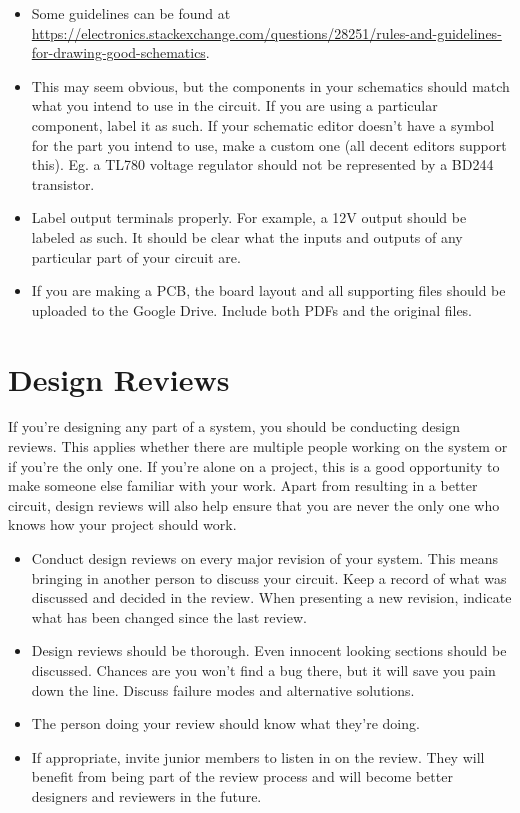 \documentclass{article}
\begin{document}
\begin{enumerate}
\begin{itemize}
\item Some guidelines can be found at \url{https://electronics.stackexchange.com/questions/28251/rules-and-guidelines-for-drawing-good-schematics}.
\item This may seem obvious, but the components in your schematics should match what you intend to use in the circuit. If you are using a particular component, label it as such. If your schematic editor doesn't have a symbol for the part you intend to use, make a custom one (all decent editors support this). Eg. a TL780 voltage regulator should not be represented by a BD244 transistor.
\item Label output terminals properly. For example, a 12V output should be labeled as such. It should be clear what the inputs and outputs of any particular part of your circuit are.
\item If you are making a PCB, the board layout and all supporting files should be uploaded to the Google Drive. Include both PDFs and the original files.
\end{itemize}
\end{enumerate}

\section{Design Reviews}
If you're designing any part of a system, you should be conducting design reviews. This applies whether there are multiple people working on the system or if you're the only one. If you're alone on a project, this is a good opportunity to make someone else familiar with your work. Apart from resulting in a better circuit, design reviews will also help ensure that you are never the only one who knows how your project should work.
\begin{itemize}
\item  Conduct design reviews on every major revision of your system. This means bringing in another person to discuss your circuit. Keep a record of what was discussed and decided in the review. When presenting a new revision, indicate what has been changed since the last review.
\item Design reviews should be thorough. Even innocent looking sections should be discussed. Chances are you won't find a bug there, but it will save you pain down the line. Discuss failure modes and alternative solutions.
\item The person doing your review should know what they're doing.
\item If appropriate, invite junior members to listen in on the review. They will benefit from being part of the review process and will become better designers and reviewers in the future.
\end{itemize}
\end{document}
